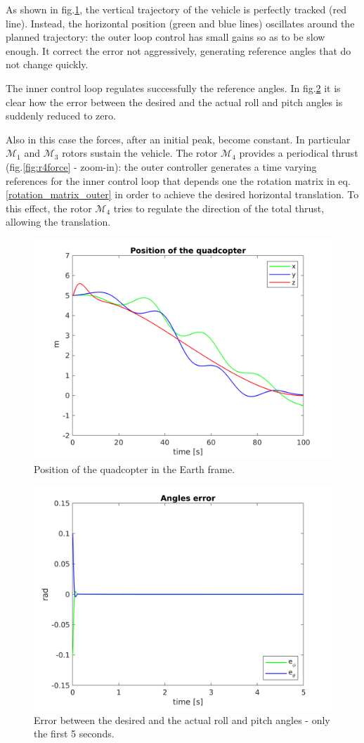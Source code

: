 \documentclass[11pt,a4paper]{scrartcl}
\begin{document}
As shown in fig.\ref{fig:position}, the vertical trajectory of the vehicle is perfectly tracked (red line). Instead, the horizontal position (green and blue lines) oscillates around the planned trajectory: the outer loop control has small gains so as to be slow enough. It correct the error not aggressively, generating reference angles that do not change quickly.

The inner control loop regulates successfully the reference angles. In fig.\ref{fig:angles_error} it is clear how the error between the desired and the actual roll and pitch angles is suddenly reduced to zero.

Also in this case the forces, after an initial peak, become constant. In particular $ \mathcal{M}_1 $ and $ \mathcal{M}_3 $ rotors sustain the vehicle. The rotor $ \mathcal{M}_4 $ provides a periodical thrust (fig.\ref{fig:r4force} - zoom-in): the outer controller generates a time varying references for the inner control loop that depends one the rotation matrix in eq.\eqref{rotation_matrix_outer} in order to achieve the desired horizontal translation. To this effect, the rotor $ \mathcal{M}_4 $ tries to regulate the direction of the total thrust, allowing the translation. 

\begin{figure}[H]
	\centering
	\includegraphics[width=0.7\linewidth]{Images/Position}
	\caption{Position of the quadcopter in the Earth frame.}
	\label{fig:position}
\end{figure}

\begin{figure}
	\centering
	\includegraphics[width=0.7\linewidth]{Images/Angles_error}
	\caption{Error between the desired and the actual roll and pitch angles - only the first 5 seconds.}
	\label{fig:angles_error}
\end{figure}
\end{document}
